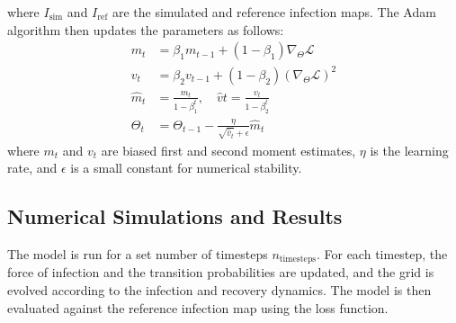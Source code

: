\documentclass[12pt]{article}
\begin{document}
where $I_{\text{sim}}$ and $I_{\text{ref}}$ are the simulated and reference infection maps. The Adam algorithm then updates the parameters as follows:
\begin{align*}
m_t &= \beta_1 m_{t-1} + (1 - \beta_1) \nabla_\Theta \mathcal{L} \\
v_t &= \beta_2 v_{t-1} + (1 - \beta_2) (\nabla_\Theta \mathcal{L})^2 \\
\hat{m}_t &= \frac{m_t}{1 - \beta_1^t}, \quad \hat{v}t = \frac{v_t}{1 - \beta_2^t} \\
\Theta_t &= \Theta_{t-1} - \frac{\eta}{\sqrt{\hat{v}_t} + \epsilon} \hat{m}_t
\end{align*}
where $m_t$ and $v_t$ are biased first and second moment estimates, $\eta$ is the learning rate, and $\epsilon$ is a small constant for numerical stability.
\subsection{Numerical Simulations and Results}
The model is run for a set number of timesteps $n_{\text{timesteps}}$. For each timestep, the force of infection and the transition probabilities are updated, and the grid is evolved according to the infection and recovery dynamics. The model is then evaluated against the reference infection map using the loss function.
\end{document}
